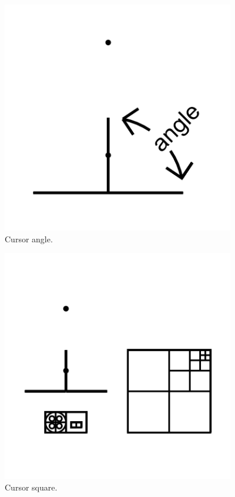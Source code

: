 \begin{figure}
	\centering
	\includegraphics[width=4in]{figures/web2d/cursorangle1.png}
	\caption[cursorangle]
	{Cursor angle.}
\end{figure}
\begin{figure}
	\centering
	\includegraphics[width=4in]{figures/web2d/cursorsquare.png}
	\caption[cursorsquare]
	{Cursor square.}
\end{figure}
